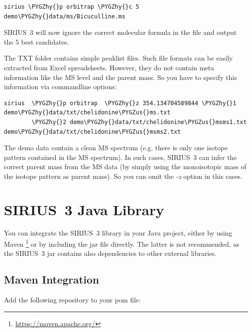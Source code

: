 \documentclass[letterpaper,10pt,openany,oneside]{sphinxmanual}
\def\PYGZus{\char`\_}
\def\PYGZhy{\char`\-}
\begin{document}
\begin{Verbatim}[commandchars=\\\{\}]
sirius \PYGZhy{}p orbitrap \PYGZhy{}c 5 demo\PYGZhy{}data/ms/Bicuculline.ms
\end{Verbatim}

SIRIUS~3 will now ignore the correct molecular formula in the file and output the 5 best candidates.

The TXT folder contains simple peaklist files. Such file formats can be easily extracted from Excel spreadsheets. However, they do not contain meta information like the MS level and the parent mass. So you have to specify this information via commandline options:

\begin{Verbatim}[commandchars=\\\{\}]
sirius  \PYGZhy{}p orbitrap  \PYGZhy{}z 354.134704589844 \PYGZhy{}1 demo\PYGZhy{}data/txt/chelidonine\PYGZus{}ms.txt
        \PYGZhy{}2 demo\PYGZhy{}data/txt/chelidonine\PYGZus{}msms1.txt demo\PYGZhy{}data/txt/chelidonine\PYGZus{}msms2.txt
\end{Verbatim}

The demo data contain a clean MS spectrum (e.g. there is only one isotope pattern contained in the MS spectrum). In such cases, SIRIUS~3 can infer the correct parent mass from the MS data (by simply using the monoisotopic mass of the isotope pattern as parent mass). So you can omit the \emph{-z} option in this cases.


\chapter{SIRIUS~3 Java Library}
\label{library:sirius-java-library}\label{library::doc}
You can integrate the SIRIUS~3 library in your Java project, either by using Maven \footnote{\sphinxAtStartFootnote%
\url{https://maven.apache.org/}
} or by including the jar file directly. The latter is not recommended, as the SIRIUS~3 jar contains also dependencies to other external libraries.



\section{Maven Integration}
\label{library:maven-integration}
Add the following repository to your pom file:
\end{document}
